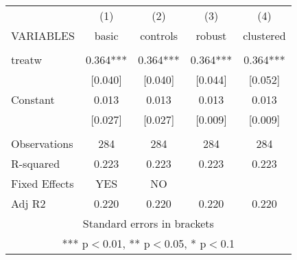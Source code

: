 \documentclass[]{article}
\begin{document}
\begin{tabular}{lcccc} \hline
 & (1) & (2) & (3) & (4) \\
VARIABLES & basic & controls & robust & clustered \\ \hline
 &  &  &  &  \\
treatw & 0.364*** & 0.364*** & 0.364*** & 0.364*** \\
 & [0.040] & [0.040] & [0.044] & [0.052] \\
Constant & 0.013 & 0.013 & 0.013 & 0.013 \\
 & [0.027] & [0.027] & [0.009] & [0.009] \\
 &  &  &  &  \\
Observations & 284 & 284 & 284 & 284 \\
R-squared & 0.223 & 0.223 & 0.223 & 0.223 \\
Fixed Effects & YES & NO &  &  \\
 Adj R2 & 0.220 & 0.220 & 0.220 & 0.220 \\ \hline
\multicolumn{5}{c}{ Standard errors in brackets} \\
\multicolumn{5}{c}{ *** p$<$0.01, ** p$<$0.05, * p$<$0.1} \\
\end{tabular}
\end{document}
